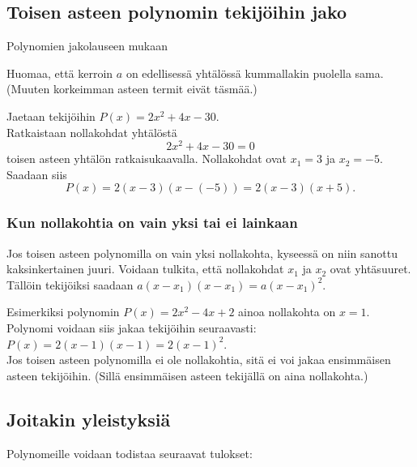 \subsection*{Toisen asteen polynomin tekijöihin jako}

Polynomien jakolauseen mukaan

Huomaa, että kerroin $a$ on edellisessä yhtälössä kummallakin puolella sama.
(Muuten korkeimman asteen termit eivät täsmää.)

\begin{esimerkki}
Jaetaan tekijöihin $P(x)=2x^2 + 4x-30$. \\
Ratkaistaan nollakohdat yhtälöstä $$2x^2 + 4x-30=0$$ toisen asteen yhtälön ratkaisukaavalla.
Nollakohdat ovat $x_1=3$ ja $x_2=-5$. Saadaan siis
$$P(x)= 2(x-3)(x-(-5)) = 2(x-3)(x+5).$$
\end{esimerkki}

\subsubsection*{Kun nollakohtia on vain yksi tai ei lainkaan}
Jos toisen asteen polynomilla on vain yksi nollakohta, kyseessä on niin sanottu kaksinkertainen juuri. Voidaan tulkita, että nollakohdat $x_1$ ja $x_2$ ovat yhtäsuuret. Tällöin tekijöiksi saadaan $a(x-x_1)(x-x_1)=a(x-x_1)^2$.

Esimerkiksi polynomin $P(x)=2x^2-4x+2$ ainoa nollakohta on $x=1$. Polynomi voidaan siis jakaa tekijöihin seuraavasti: \\ $P(x)=2(x-1)(x-1)=2(x-1)^2$. \\

Jos toisen asteen polynomilla ei ole nollakohtia, sitä ei voi jakaa ensimmäisen asteen tekijöihin. (Sillä ensimmäisen asteen tekijällä on aina nollakohta.)

\subsection*{Joitakin yleistyksiä}

Polynomeille voidaan todistaa seuraavat tulokset:


